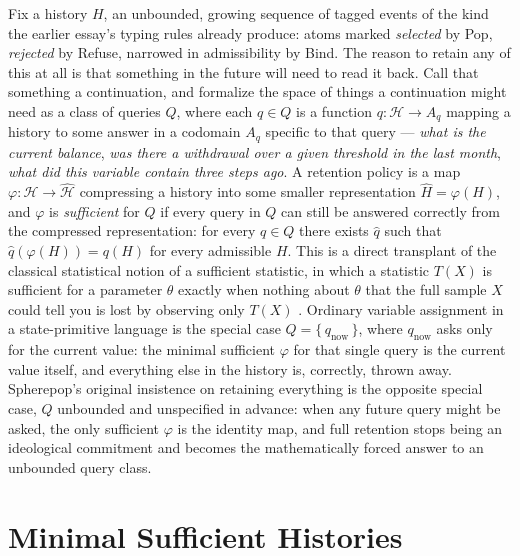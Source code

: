 \documentclass[11pt]{article}
\begin{document}
Fix a history $H$, an unbounded, growing sequence of tagged events of the kind the earlier essay's typing rules already produce: atoms marked \emph{selected} by Pop, \emph{rejected} by Refuse, narrowed in admissibility by Bind. The reason to retain any of this at all is that something in the future will need to read it back. Call that something a continuation, and formalize the space of things a continuation might need as a class of queries $Q$, where each $q \in Q$ is a function $q : \mathcal{H} \to A_q$ mapping a history to some answer in a codomain $A_q$ specific to that query --- \emph{what is the current balance}, \emph{was there a withdrawal over a given threshold in the last month}, \emph{what did this variable contain three steps ago}. A retention policy is a map $\varphi : \mathcal{H} \to \hat{\mathcal{H}}$ compressing a history into some smaller representation $\hat{H} = \varphi(H)$, and $\varphi$ is \emph{sufficient} for $Q$ if every query in $Q$ can still be answered correctly from the compressed representation: for every $q \in Q$ there exists $\hat{q}$ such that $\hat{q}(\varphi(H)) = q(H)$ for every admissible $H$. This is a direct transplant of the classical statistical notion of a sufficient statistic, in which a statistic $T(X)$ is sufficient for a parameter $\theta$ exactly when nothing about $\theta$ that the full sample $X$ could tell you is lost by observing only $T(X)$ \cite{fisher1922}. Ordinary variable assignment in a state-primitive language is the special case $Q = \{\, q_{\mathrm{now}} \,\}$, where $q_{\mathrm{now}}$ asks only for the current value: the minimal sufficient $\varphi$ for that single query is the current value itself, and everything else in the history is, correctly, thrown away. Spherepop's original insistence on retaining everything is the opposite special case, $Q$ unbounded and unspecified in advance: when any future query might be asked, the only sufficient $\varphi$ is the identity map, and full retention stops being an ideological commitment and becomes the mathematically forced answer to an unbounded query class.

\section{Minimal Sufficient Histories}
\end{document}

